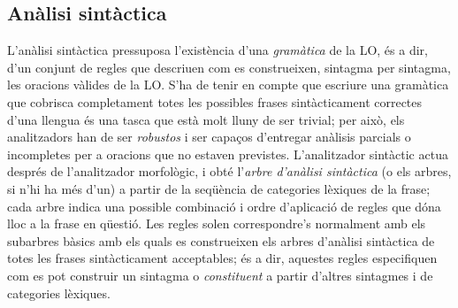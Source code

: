 \subsection{Anàlisi sintàctica}
\label{s3:ansyn}
L'anàlisi sintàctica pressuposa l'existència d'una \emph{gramàtica} de
la LO, és a dir, d'un conjunt de regles que descriuen com es
construeixen, sintagma per sintagma, les oracions vàlides de la
LO. S'ha de tenir en compte que escriure una gramàtica que cobrisca
completament totes les possibles frases sintàcticament correctes d'una
llengua és una tasca que està molt lluny de ser trivial; per això, els
analitzadors han de ser \emph{robustos} i ser capaços d'entregar
anàlisis parcials o incompletes per a oracions que no estaven
previstes. L'analitzador sintàctic actua després de l'analitzador
morfològic, i obté l'\emph{arbre d'anàlisi sintàctica} (o els arbres,
si n'hi ha més d'un) a partir de la seqüència de categories lèxiques
de la frase; cada arbre indica una possible combinació i ordre
d'aplicació de regles que dóna lloc a la frase en qüestió. Les regles
solen correspondre's normalment amb els subarbres bàsics amb els quals
es construeixen els arbres d'anàlisi sintàctica de totes les frases
sintàcticament acceptables; és a dir, aquestes regles especifiquen com
es pot construir un sintagma o {\em constituent} a partir d'altres
sintagmes i de categories lèxiques.

